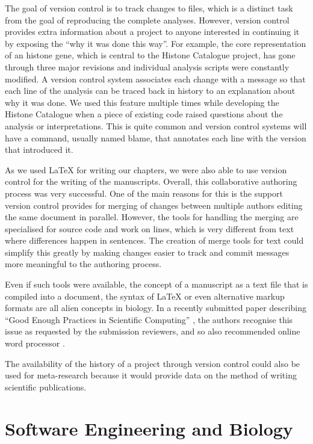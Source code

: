 The goal of version control is to track changes to files, which is a
distinct task from the goal of reproducing the complete analyses.
However, version control provides extra information about a project to
anyone interested in continuing it by exposing the ``why it was
done this way''.  For example, the core
representation of an histone gene,
which is central to the Histone Catalogue project, has gone through
three major revisions and individual analysis scripts were constantly
modified.  A version control system associates each change with a
message so that each line of the analysis can be traced back in
history to an explanation about why it was done.  We used this
feature multiple times while developing the Histone Catalogue when a
piece of existing code raised questions about the analysis or interpretations.
This is quite common and version control systems will have a command,
usually named blame, that annotates each line with the version that
introduced it.

As we used \LaTeX{} for
writing our chapters, we were also able to use version control for
the writing of the manuscripts.
Overall, this collaborative authoring process was very successful.
One of the main reasons for this
is the support version control
provides for merging of changes between multiple authors
editing the same document in parallel.  However, the tools for
handling the merging are specialised for source code and work on
lines, which is very different from text where differences
happen in sentences.  The creation of merge tools for text could
simplify this greatly by making changes easier to track and commit
messages more meaningful to the authoring process.

Even if such tools were available, the concept of a manuscript as a text
file that is compiled into a document, the syntax of \LaTeX{} or even
alternative markup formats are all alien concepts in biology.
In a recently submitted paper describing ``Good Enough
Practices in Scientific Computing'' \citep{good-enough-2016-v2}, the
authors recognise this issue as requested by the submission reviewers,
and so also recommended online word processor .

The availability of the history of a project through version control
could also be used for meta-research because it would provide data on the
method of writing scientific publications.

\section{Software Engineering and Biology}

